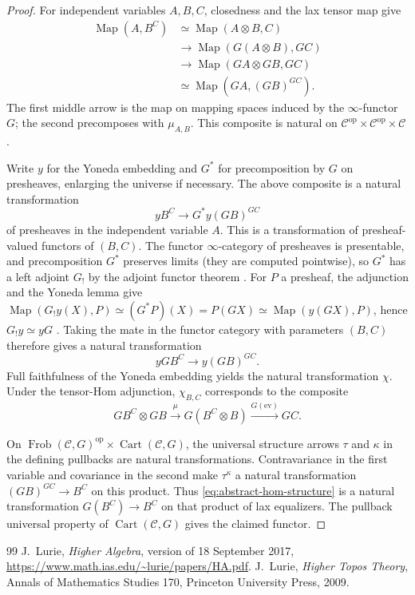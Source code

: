 \documentclass[10pt,a4paper]{amsart}
\newcommand{\Cart}{\operatorname{Cart}}
\newcommand{\Frob}{\operatorname{Frob}}
\newcommand{\Map}{\operatorname{Map}}
\newcommand{\cC}{\mathcal{C}}
\newcommand{\ev}{\mathrm{ev}}
\newcommand{\op}{{\operatorname{op}}}
\begin{document}
\begin{proof}
For independent variables $A,B,C$, closedness and the lax tensor map give
\begin{align*}
 \Map(A,B^C)
 &\simeq\Map(A\otimes B,C)\\
 &\longrightarrow\Map(G(A\otimes B),GC)\\
 &\longrightarrow\Map(GA\otimes GB,GC)\\
 &\simeq\Map(GA,(GB)^{GC}).
\end{align*}
The first middle arrow is the map on mapping spaces induced by the $\infty$-functor $G$; the second
precomposes with $\mu_{A,B}$.
This composite is natural on
$\cC^{\op}\times\cC^{\op}\times\cC$.

Write $y$ for the Yoneda embedding and $G^*$ for precomposition by $G$ on presheaves, enlarging the universe if necessary.
The above composite is a natural transformation
\[
 yB^C\longrightarrow G^*y (GB)^{GC}
\]
of presheaves in the independent variable $A$.
This is a transformation of presheaf-valued functors of $(B,C)$.
The functor $\infty$-category of presheaves is presentable, and precomposition $G^*$ preserves limits (they are computed pointwise), so $G^*$ has a left adjoint $G_!$ by the adjoint functor theorem \cite[Corollary 5.5.2.9]{HTT}.
For $P$ a presheaf, the adjunction and the Yoneda lemma give
$\Map(G_!y(X),P)\simeq (G^*P)(X)=P(GX)\simeq\Map(y(GX),P)$,
hence $G_!y\simeq yG$
\cite[Proposition 5.1.3.1]{HTT}.
Taking the mate in the functor category with parameters $(B,C)$
therefore gives a natural transformation
\[
 yG B^C\longrightarrow y (GB)^{GC}.
\]
Full faithfulness of the Yoneda embedding yields the natural transformation $\chi$.
Under the tensor-Hom adjunction, $\chi_{B,C}$ corresponds to the composite
\[
 G B^C\otimes GB\xrightarrow{\mu}
 G(B^C\otimes B)\xrightarrow{G(\ev)}GC.
\]

On $\Frob(\cC,G)^{\op}\times\Cart(\cC,G)$, the universal structure
arrows $\tau$ and $\kappa$ in the defining pullbacks are natural
transformations.
Contravariance in the first variable and covariance in the second make
$\tau^\kappa$ a natural transformation
$(GB)^{GC}\to B^C$ on this product.
Thus \eqref{eq:abstract-hom-structure} is a natural transformation $G(B^C)\to B^C$ on that product of lax equalizers.
The pullback universal property of $\Cart(\cC,G)$ gives the claimed functor.
\end{proof}

\begin{thebibliography}{99}
 J.~Lurie, \emph{Higher Algebra}, version of 18 September 2017, \url{https://www.math.ias.edu/~lurie/papers/HA.pdf}.
 J.~Lurie, \emph{Higher Topos Theory}, Annals of Mathematics Studies 170, Princeton University Press, 2009.
\end{thebibliography}
\end{document}
